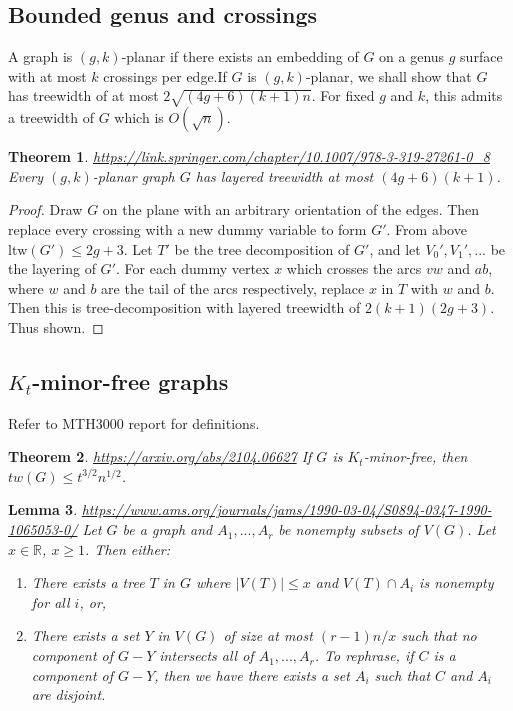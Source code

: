 \documentclass[]{article}
\newcommand{\ltw}{\text{ltw}}
\newtheorem{theorem}{Theorem}
\newtheorem{lemma}[theorem]{Lemma}
\theoremstyle{definition}
\numberwithin{theorem}{section}
\numberwithin{equation}{section}
\begin{document}
\subsection{Bounded genus and crossings}
A graph is $(g, k)$-planar if there exists an embedding of $G$ on a genus $g$ surface with at most $k$ crossings per edge.If $G$ is $(g, k)$-planar, we shall show that $G$ has treewidth of at most $2\sqrt{(4g + 6)(k + 1) n}$. For fixed $g$ and $k$, this admits a treewidth of $G$ which is $O(\sqrt{n})$. 
\begin{theorem}{\url{https://link.springer.com/chapter/10.1007/978-3-319-27261-0_8}}
	Every $(g, k)$-planar graph $G$ has layered treewidth at most $(4g + 6)(k + 1)$. 
\end{theorem}

\begin{proof}
	Draw $G$ on the plane with an arbitrary orientation of the edges. Then replace every crossing with a new dummy variable to form $G'$. From above $\ltw(G') \leq 2g + 3$. Let $T'$ be the tree decomposition of $G'$, and let $V_0', V_1', ...$ be the layering of $G'$. For each dummy vertex $x$ which crosses the arcs $vw$ and $ab$, where $w$ and $b$ are the tail of the arcs respectively, replace $x$ in $T$ with $w$ and $b$. Then this is tree-decomposition with layered treewidth of $2(k+1) (2g + 3)$. Thus shown. 
\end{proof}

\subsection{$K_t$-minor-free graphs}
Refer to MTH3000 report for definitions.

\begin{theorem}{\url{https://arxiv.org/abs/2104.06627}}
	If $G$ is $K_t$-minor-free, then $tw(G) \leq t^{3/2} n^{1/2}$. 
\end{theorem} 

\begin{lemma}{\url{https://www.ams.org/journals/jams/1990-03-04/S0894-0347-1990-1065053-0/}}
	Let $G$ be a graph and $A_1, ..., A_r$ be nonempty subsets of $V(G)$. Let $x \in \mathbb{R}$, $x \geq 1$. Then either:
	\begin{enumerate}
		\item There exists a tree $T$ in $G$ where $|V(T)| \leq x$ and $V(T) \cap A_i$ is nonempty for all $i$, or,
		\item There exists a set $Y$ in $V(G)$ of size at most $(r-1)n/x$ such that no component of $G-Y$ intersects all of $A_1, ..., A_r$. To rephrase, if $C$ is a component of $G - Y$, then we have there exists a set $A_i$ such that $C$ and $A_i$ are disjoint. 
	\end{enumerate}
\end{lemma}
\end{document}
